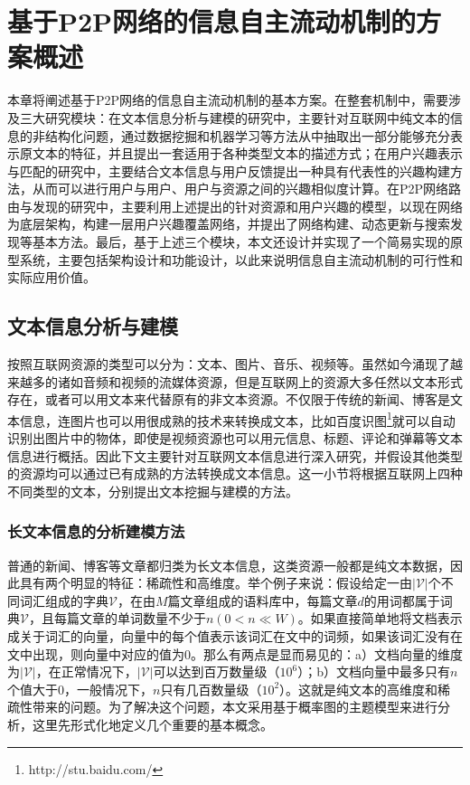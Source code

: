 \section{基于P2P网络的信息自主流动机制的方案概述}
本章将阐述基于P2P网络的信息自主流动机制的基本方案。在整套机制中，需要涉及三大研究模块：在文本信息分析与建模的研究中，主要针对互联网中纯文本的信息的非结构化问题，通过数据挖掘和机器学习等方法从中抽取出一部分能够充分表示原文本的特征，并且提出一套适用于各种类型文本的描述方式；在用户兴趣表示与匹配的研究中，主要结合文本信息与用户反馈提出一种具有代表性的兴趣构建方法，从而可以进行用户与用户、用户与资源之间的兴趣相似度计算。在P2P网络路由与发现的研究中，主要利用上述提出的针对资源和用户兴趣的模型，以现在网络为底层架构，构建一层用户兴趣覆盖网络，并提出了网络构建、动态更新与搜索发现等基本方法。最后，基于上述三个模块，本文还设计并实现了一个简易实现的原型系统，主要包括架构设计和功能设计，以此来说明信息自主流动机制的可行性和实际应用价值。

\subsection{文本信息分析与建模}
按照互联网资源的类型可以分为：文本、图片、音乐、视频等。虽然如今涌现了越来越多的诸如音频和视频的流媒体资源，但是互联网上的资源大多任然以文本形式存在，或者可以用文本来代替原有的非文本资源。不仅限于传统的新闻、博客是文本信息，连图片也可以用很成熟的技术来转换成文本，比如百度识图\footnote{http://stu.baidu.com/}就可以自动识别出图片中的物体，即使是视频资源也可以用元信息、标题、评论和弹幕等文本信息进行概括。因此下文主要针对互联网文本信息进行深入研究，并假设其他类型的资源均可以通过已有成熟的方法转换成文本信息。这一小节将根据互联网上四种不同类型的文本，分别提出文本挖掘与建模的方法。

\subsubsection{长文本信息的分析建模方法}
普通的新闻、博客等文章都归类为长文本信息，这类资源一般都是纯文本数据，因此具有两个明显的特征：稀疏性和高维度。举个例子来说：假设给定一由$|\mathcal{V}|$个不同词汇组成的字典$\mathcal{V}$，在由$M$篇文章组成的语料库中，每篇文章$d$的用词都属于词典$\mathcal{V}$，且每篇文章的单词数量不少于$n (0<n\ll W)$。如果直接简单地将文档表示成关于词汇的向量，向量中的每个值表示该词汇在文中的词频，如果该词汇没有在文中出现，则向量中对应的值为0。那么有两点是显而易见的：a）文档向量的维度为$|\mathcal{V}|$，在正常情况下，$|\mathcal{V}|$可以达到百万数量级（$10^6$）；b）文档向量中最多只有$n$个值大于0，一般情况下，$n$只有几百数量级（$10^2$）。这就是纯文本的高维度和稀疏性带来的问题。为了解决这个问题，本文采用基于概率图的主题模型来进行分析，这里先形式化地定义几个重要的基本概念。

